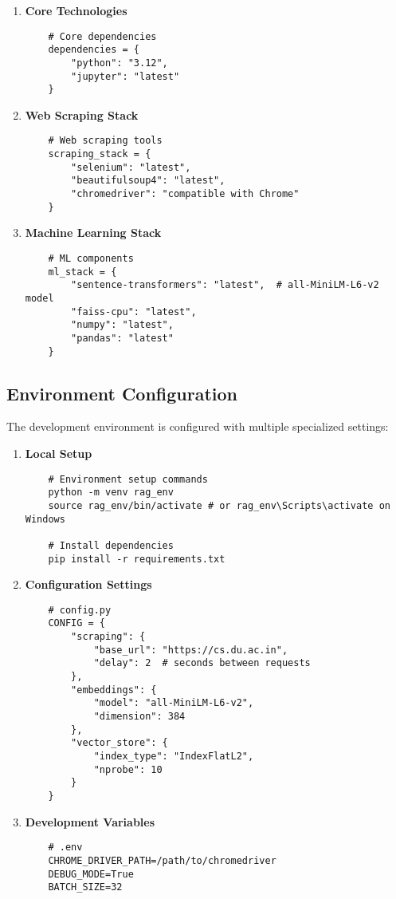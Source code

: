 \documentclass[12pt,a4paper]{report}
\begin{document}
\begin{enumerate}
    \item \textbf{Core Technologies}
    \begin{verbatim}
    # Core dependencies
    dependencies = {
        "python": "3.12",
        "jupyter": "latest"
    }
    \end{verbatim}

    \item \textbf{Web Scraping Stack}
    \begin{verbatim}
    # Web scraping tools
    scraping_stack = {
        "selenium": "latest",
        "beautifulsoup4": "latest",
        "chromedriver": "compatible with Chrome"
    }
    \end{verbatim}

    \item \textbf{Machine Learning Stack}
    \begin{verbatim}
    # ML components
    ml_stack = {
        "sentence-transformers": "latest",  # all-MiniLM-L6-v2 model
        "faiss-cpu": "latest",
        "numpy": "latest",
        "pandas": "latest"
    }
    \end{verbatim}
\end{enumerate}


\subsection{Environment Configuration}
The development environment is configured with multiple specialized settings:

\begin{enumerate}
    \item \textbf{Local Setup}
    \begin{verbatim}
    # Environment setup commands
    python -m venv rag_env
    source rag_env/bin/activate # or rag_env\Scripts\activate on Windows
    
    # Install dependencies
    pip install -r requirements.txt
    \end{verbatim}

    \item \textbf{Configuration Settings}
    \begin{verbatim}
    # config.py
    CONFIG = {
        "scraping": {
            "base_url": "https://cs.du.ac.in",
            "delay": 2  # seconds between requests
        },
        "embeddings": {
            "model": "all-MiniLM-L6-v2",
            "dimension": 384
        },
        "vector_store": {
            "index_type": "IndexFlatL2",
            "nprobe": 10
        }
    }
    \end{verbatim}

    \item \textbf{Development Variables}
    \begin{verbatim}
    # .env
    CHROME_DRIVER_PATH=/path/to/chromedriver
    DEBUG_MODE=True
    BATCH_SIZE=32
    \end{verbatim}
\end{enumerate}
\end{document}
